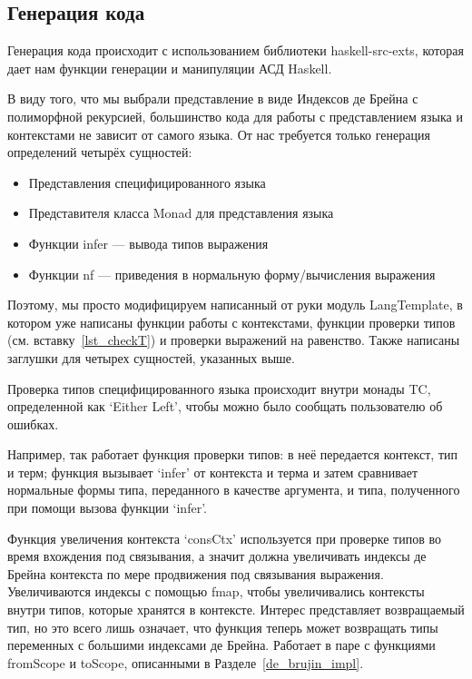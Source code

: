 \subsection{Генерация кода}
Генерация кода происходит с использованием библиотеки haskell-src-exts\cite{src_exts}, которая дает нам функции генерации и манипуляции АСД Haskell.

В виду того, что мы выбрали представление в виде Индексов де Брейна с полиморфной рекурсией, большинство кода для работы с представлением языка и контекстами не зависит от самого языка. От нас требуется только генерация определений четырёх сущностей:

\begin{itemize}
\item Представления специфицированного языка
\item Представителя класса Monad для представления языка
\item Функции infer --- вывода типов выражения
\item Функции nf --- приведения в нормальную форму/вычисления выражения
\end{itemize}

Поэтому, мы просто модифицируем написанный от руки модуль LangTemplate, в котором уже написаны функции работы с контекстами, функции проверки типов (см. вставку~\ref{lst_checkT}) и проверки выражений на равенство. Также написаны заглушки для четырех сущностей, указанных выше.

Проверка типов специфицированного языка происходит внутри монады TC, определенной как `Either Left', чтобы можно было сообщать пользователю об ошибках.

Например, так работает функция проверки типов: в неё передается контекст, тип и терм; функция вызывает `infer' от контекста и терма и затем сравнивает нормальные формы типа, переданного в качестве аргумента, и типа, полученного при помощи вызова функции `infer'.

Функция увеличения контекста `consCtx' используется при проверке типов во время вхождения под связывания, а значит должна увеличивать индексы де Брейна контекста по мере продвижения под связывания выражения. Увеличиваются индексы с помощью fmap, чтобы увеличивались контексты внутри типов, которые хранятся в контексте. Интерес представляет возвращаемый тип, но это всего лишь означает, что функция теперь может возвращать типы переменных с большими индексами де Брейна. Работает в паре с функциями fromScope и toScope, описанными в Разделе~\ref{de_brujin_impl}.

